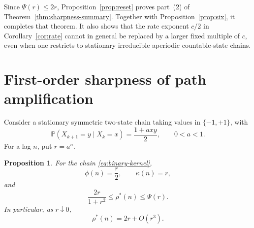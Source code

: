 \documentclass[11pt]{amsart}
\numberwithin{equation}{section}
\newtheorem{proposition}[theorem]{Proposition}
\theoremstyle{definition}
\newcommand{\PP}{\mathbb P}
\newcommand{\rhostar}{\rho^{*}}
\begin{document}
Since $\Psi(r)\le2r$, Proposition~\ref{prop:reset} proves part~(2) of Theorem~\ref{thm:sharpness-summary}. Together with Proposition~\ref{prop:six}, it completes that theorem. It also shows that the rate exponent $c/2$ in Corollary~\ref{cor:rate} cannot in general be replaced by a larger fixed multiple of $c$, even when one restricts to stationary irreducible aperiodic countable-state chains.

\section{First-order sharpness of path amplification}\label{sec:binary}

Consider a stationary symmetric two-state chain taking values in $\{-1,+1\}$, with
\begin{equation}\label{eq:binary-kernel}
\PP(X_{k+1}=y\mid X_k=x)=\frac{1+axy}{2},\qquad 0<a<1.
\end{equation}
For a lag $n$, put $r=a^n$.

\begin{proposition}\label{prop:binary}
For the chain \eqref{eq:binary-kernel},
\begin{equation}\label{eq:binary-basic}
\phi(n)=\frac r2,\qquad \kappa(n)=r,
\end{equation}
and
\begin{equation}\label{eq:binary-envelope}
\frac{2r}{1+r^2}\le\rhostar(n)\le\Psi(r).
\end{equation}
In particular, as $r\downarrow0$,
\begin{equation}\label{eq:binary-first-order}
\rhostar(n)=2r+O(r^3).
\end{equation}
\end{proposition}
\end{document}
